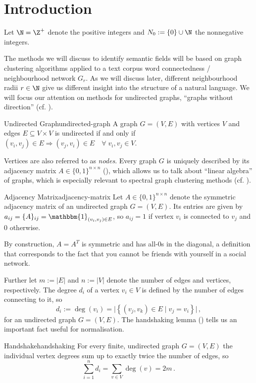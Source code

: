 \documentclass[12pt, a4paper]{article}
\newcommand{\identity}{\mathbbm{1}}
\begin{document}
  \pagebreak
  \pagestyle{normal}

  \tableofcontents
  \pagebreak

  \section{Introduction}
  Let $\N = \Z^+$ denote the positive integers and $N_0 := \{0\} \cup \N$ the nonnegative integers.

  The methods we will discuss to identify semantic fields will be based on graph clustering algorithms applied to a text corpus word connectedness / neighbourhood network $G_r$.
  As we will discuss later, different neighbourhood radii $r \in \N$ give us different insight into the structure of a natural language.
  We will focus our attention on methods for undirected graphs, ``graphs without direction'' (cf. ).
  \begin{definition}{Undirected Graph}{undirected-graph}
    A graph $G = (V, E)$ with vertices $V$ and edges $E \subseteq V \times V$ is undirected if and only if $(v_i, v_j) \in E \Rightarrow (v_j, v_i) \in E \quad \forall\; v_i, v_j \in V$.
  \end{definition}

  Vertices are also referred to as \textit{nodes}.
  Every graph $G$ is uniquely described by its adjacency matrix $A \in \{0, 1\}^{n \times n}$ (), which allows us to talk about ``linear algebra'' of graphs, which is especially relevant to spectral graph clustering methods (cf. ).

  \begin{definition}{Adjacency Matrix}{adjacency-matrix}
    Let $A \in \{0, 1\}^{n \times n}$ denote the symmetric adjacency matrix of an undirected graph $G = (V, E)$. Its entries are given by $a_{ij} = \{A\}_{ij} = \identity_{(v_i, v_j) \in E}$, so $a_{ij} = 1$ if vertex $v_i$ is connected to $v_j$ and $0$ otherwise.
  \end{definition}

  By construction, $A = A^T$ is symmetric and has all-$0$s in the diagonal, a definition that corresponds to the fact that you cannot be friends with yourself in a social network.

  Further let $m := |E|$ and $n := |V|$ denote the number of edges and vertices, respectively.
  The degree $d_i$ of a vertex $v_i \in V$ is defined by the number of edges connecting to it, so $$d_i := \deg(v_i) = \big|\left\{(v_j, v_k) \in E \;|\; v_j = v_i\right\}\big|\,,$$ for an undirected graph $G = (V, E)$. The handshaking lemma () tells us an important fact useful for normalisation.
  \begin{lemma}{Handshake}{handshaking}
    For every finite, undirected graph $G = (V, E)$ the individual vertex degrees sum up to exactly twice the number of edges, so $$\sum_{i=1}^{n} d_i = \sum_{v \in V} \deg(v) = 2m\,.$$
  \end{lemma}
\end{document}

